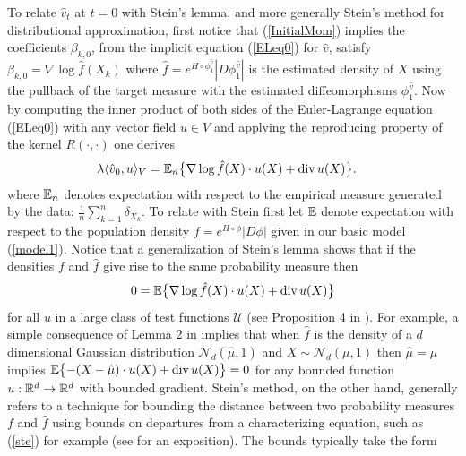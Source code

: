 \documentclass[noinfoline]{imsart}
\begin{document}
To relate $\hat v_t$ at $t=0$ with Stein's lemma, and more generally Stein's method for distributional approximation,  first notice that (\ref{InitialMom}) implies the coefficients $\beta_{k,0}$,  from the implicit equation  (\ref{ELeq0}) for  $\hat v$, satisfy
$\beta_{k,0}%
 = \nabla \log \hat f(X_k)
$ where  $\hat f= e^{ H\circ \phi^{\hat v}_1}  |D\phi_1^{\hat v}| $ is the estimated density of $X$ using the pullback of the target measure with the estimated diffeomorphisms $\phi^{\hat v}_1$.
 Now by computing the inner product of  both sides of the Euler-Lagrange equation (\ref{ELeq0}) with any vector field $u\in V$ and applying the reproducing property of the kernel $R(\cdot,\cdot)$ one derives
 \begin{align}
\lambda \langle \hat v_0, u\rangle_V%
&=\Bbb E_n\bigl\{ \nabla \log \hat f(X)\cdot  u(X) + \text{div}\, u(X)\bigr\}. \label{stein2} 
\end{align}
where $\Bbb E_n$ denotes  expectation with respect to the empirical measure generated by the data: $\frac{1}{n}\sum_{k=1}^n \delta_{X_k}$. 
To relate with Stein first let $\Bbb E$ denote expectation with respect to the population density $f =    e^{ H\circ \phi} |D\phi| $ given in our basic model (\ref{model1}). Notice that a generalization of Stein's lemma shows that if the densities $f$ and $\hat f$ give rise to the same probability measure then
\begin{equation}
\label{ste}
0= \Bbb E\bigl\{ \nabla \log \hat f(X) \cdot u(X) + \text{div}\, u(X)\bigr\} 
 \end{equation}
for all $u$ in a large class of test functions $\mathcal U$ (see Proposition 4 in \cite{stein:04}).
For example, a simple consequence of Lemma 2 in \cite{stein:81} implies that when $\hat f$ is the density of a  $d$ dimensional Gaussian  distribution $\mathcal N_d(\hat\mu,1)$  and $X\sim \mathcal N_d(\mu,1)$ then $\hat\mu = \mu$ implies $ \Bbb E\bigl\{ -  (X-\hat\mu) \cdot u(X) + \text{div}\, u(X) \bigr\} =0$ 
for any bounded function $u:\Bbb R^d \rightarrow \Bbb R^d$ with bounded gradient. Stein's method, on the other hand, generally refers to  a technique for  bounding the distance between two probability measures $f$ and $\hat f$ using bounds on departures from a characterizing equation, such as  (\ref{ste}) for example (see \cite{chen:05} for an exposition). The bounds typically take the form
\end{document}
